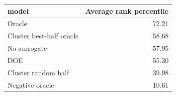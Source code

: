 \begin{tabular}{lr}
\toprule
model & Average rank percentile \\
\midrule
Oracle & 72.21 \\
Cluster best-half oracle & 58.68 \\
No surrogate & 57.95 \\
DOE & 55.30 \\
Cluster random half & 39.98 \\
Negative oracle & 10.61 \\
\bottomrule
\end{tabular}

